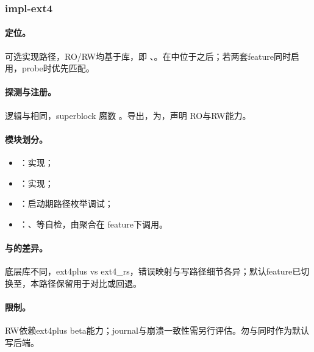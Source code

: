 
\subsubsection{impl-ext4}

\paragraph{定位。}
可选实现路径，RO/RW均基于库，即 、。在中位于之后；若两套feature同时启用，probe时优先匹配。

\paragraph{探测与注册。}
逻辑与相同，superblock 魔数 。导出，为，声明 RO与RW能力。

\paragraph{模块划分。}
\begin{itemize}
 \item {}：实现；
 \item {}：实现；
 \item {}：启动期路径枚举调试；
 \item {}：、等自检，由聚合在 feature下调用。
\end{itemize}

\paragraph{与的差异。}
底层库不同，ext4plus vs ext4\_rs，错误映射与写路径细节各异；默认feature已切换至，本路径保留用于对比或回退。

\paragraph{限制。}
RW依赖ext4plus beta能力；journal与崩溃一致性需另行评估。勿与同时作为默认写后端。

